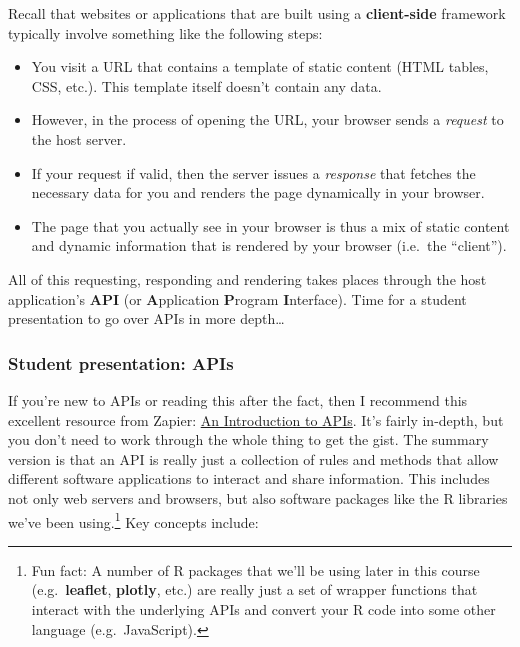 \documentclass[
]{article}
\providecommand{\tightlist}{%
  \setlength{\itemsep}{0pt}\setlength{\parskip}{0pt}}
\begin{document}
Recall that websites or applications that are built using a
\textbf{client-side} framework typically involve something like the
following steps:

\begin{itemize}
\tightlist
\item
  You visit a URL that contains a template of static content (HTML
  tables, CSS, etc.). This template itself doesn't contain any data.
\item
  However, in the process of opening the URL, your browser sends a
  \emph{request} to the host server.
\item
  If your request if valid, then the server issues a \emph{response}
  that fetches the necessary data for you and renders the page
  dynamically in your browser.
\item
  The page that you actually see in your browser is thus a mix of static
  content and dynamic information that is rendered by your browser
  (i.e.~the ``client'').
\end{itemize}

All of this requesting, responding and rendering takes places through
the host application's \textbf{API} (or \textbf{A}pplication
\textbf{P}rogram \textbf{I}nterface). Time for a student presentation to
go over APIs in more depth\ldots{}

\hypertarget{student-presentation-apis}{%
\subsubsection{Student presentation:
APIs}\label{student-presentation-apis}}

If you're new to APIs or reading this after the fact, then I recommend
this excellent resource from Zapier:
\href{https://zapier.com/learn/apis/}{An Introduction to APIs}. It's
fairly in-depth, but you don't need to work through the whole thing to
get the gist. The summary version is that an API is really just a
collection of rules and methods that allow different software
applications to interact and share information. This includes not only
web servers and browsers, but also software packages like the R
libraries we've been using.\footnote{Fun fact: A number of R packages
  that we'll be using later in this course (e.g.~\textbf{leaflet},
  \textbf{plotly}, etc.) are really just a set of wrapper functions that
  interact with the underlying APIs and convert your R code into some
  other language (e.g.~JavaScript).} Key concepts include:
\end{document}
